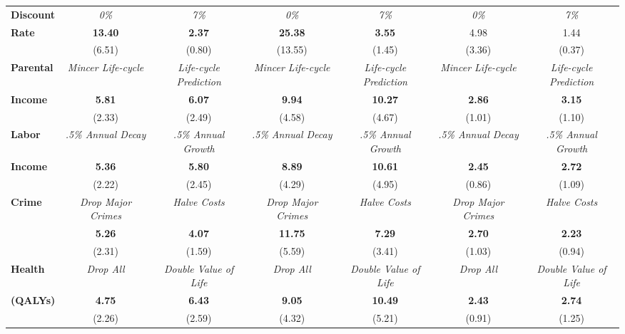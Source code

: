 \begin{tabular}{>{\bfseries}lcc|cc|cc}
Discount 	&	\textit{0\%}	&	\textit{7\%}	&	\textit{0\%}	&	\textit{7\%}	&	\textit{0\%}	&	\textit{7\%}	\\
Rate	&	\textbf{13.40}	&	\textbf{2.37}	&	\textbf{25.38}	&	\textbf{3.55}	&	4.98	&	1.44	\\
	&	(6.51)	&	(0.80)	&	(13.55)	&	(1.45)	&	(3.36)	&	(0.37)	\\ \midrule
Parental	&	\textit{Mincer Life-cycle}	&	\textit{Life-cycle Prediction}	&	\textit{Mincer Life-cycle}	&	\textit{Life-cycle Prediction}	&	\textit{Mincer Life-cycle}	&	\textit{Life-cycle Prediction}	\\
Income	&	\textbf{5.81}	&	\textbf{6.07}	&	\textbf{9.94}	&	\textbf{10.27}	&	\textbf{2.86}	&	\textbf{3.15}	\\
	&	(2.33)	&	(2.49)	&	(4.58)	&	(4.67)	&	(1.01)	&	(1.10)	\\ \midrule
Labor	&	\textit{.5\% Annual Decay}	&	\textit{.5\% Annual Growth}	&	\textit{.5\% Annual Decay}	&	\textit{.5\% Annual Growth}	&	\textit{.5\% Annual Decay}	&	\textit{.5\% Annual Growth}	\\
Income	&	\textbf{5.36}	&	\textbf{5.80}	&	\textbf{8.89}	&	\textbf{10.61}	&	\textbf{2.45}	&	\textbf{2.72}	\\
	&	(2.22)	&	(2.45)	&	(4.29)	&	(4.95)	&	(0.86)	&	(1.09)	\\ \midrule
Crime	&	\textit{Drop Major Crimes}	&	\textit{Halve Costs}	&	\textit{Drop Major Crimes}	&	\textit{Halve Costs}	&	\textit{Drop Major Crimes}	&	\textit{Halve Costs}	\\
	&	\textbf{5.26}	&	\textbf{4.07}	&	\textbf{11.75}	&	\textbf{7.29}	&	\textbf{2.70}	&	\textbf{2.23}	\\
	&	(2.31)	&	(1.59)	&	(5.59)	&	(3.41)	&	(1.03)	&	(0.94)	\\ \midrule
Health	&	\textit{Drop All}	&	\textit{Double Value of Life}	&	\textit{Drop All}	&	\textit{Double Value of Life}	&	\textit{Drop All}	&	\textit{Double Value of Life}	\\
(QALYs)	&	\textbf{4.75}	&	\textbf{6.43}	&	\textbf{9.05}	&	\textbf{10.49}	&	\textbf{2.43}	&	\textbf{2.74}	\\
	&	(2.26)	&	(2.59)	&	(4.32)	&	(5.21)	&	(0.91)	&	(1.25)	\\ \bottomrule
\end{tabular} 